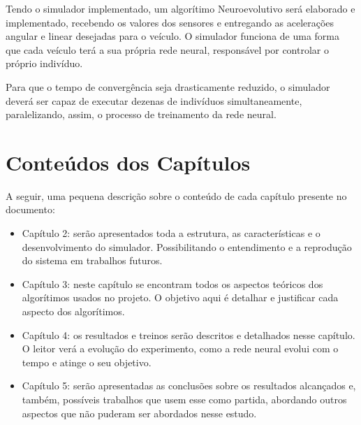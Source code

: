 Tendo o simulador implementado, um algorítimo Neuroevolutivo será elaborado e implementado, recebendo os valores dos sensores e entregando as acelerações angular e linear desejadas para o veículo. O simulador funciona de uma forma que cada veículo terá a sua própria rede neural, responsável por controlar o próprio indivíduo.

Para que o tempo de convergência seja drasticamente reduzido, o simulador deverá ser capaz de executar dezenas de indivíduos simultaneamente, paralelizando, assim, o processo de treinamento da rede neural.

\section{Conteúdos dos Capítulos}
A seguir, uma pequena descrição sobre o conteúdo de cada capítulo presente no documento:

\begin{itemize}
  \item Capítulo 2: serão apresentados toda a estrutura, as características e o desenvolvimento do simulador. Possibilitando o entendimento e a reprodução do sistema em trabalhos futuros.
  \item Capítulo 3: neste capítulo se encontram todos os aspectos teóricos dos algorítimos usados no projeto. O objetivo aqui é detalhar e justificar cada aspecto dos algorítimos.
  \item Capítulo 4: os resultados e treinos serão descritos e detalhados nesse capítulo. O leitor verá a evolução do experimento, como a rede neural evolui com o tempo e atinge o seu objetivo.
  \item Capítulo 5: serão apresentadas as conclusões sobre os resultados alcançados e, também, possíveis trabalhos que usem esse como partida, abordando outros aspectos que não puderam ser abordados nesse estudo.
\end{itemize}